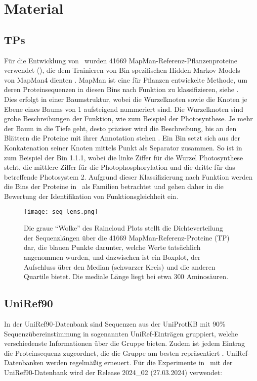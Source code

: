 \section{Material} %
\label{sec:material}
    \subsection{\aclp{TP}} %
        \label{sub:mapman}
        Für die Entwicklung von \protfin\ wurden 41669 MapMan-Referenz-Pflanzenproteine verwendet (), die dem Trainieren von Bin-spezifischen Hidden Markov Models von MapMan4 dienten \autocite{mapman}. MapMan ist eine für Pflanzen entwickelte Methode, um deren Proteinsequenzen in diesen Bins nach Funktion zu klassifizieren, siehe . Dies erfolgt in einer Baumstruktur, wobei die Wurzelknoten sowie die Knoten je Ebene eines Baums von 1 aufsteigend nummeriert sind. Die Wurzelknoten sind grobe Beschreibungen der Funktion, wie zum Beispiel der Photosynthese. Je mehr der Baum in die Tiefe geht, desto präziser wird die Beschreibung, bis an den Blättern die Proteine mit ihrer Annotation stehen \autocite{mapman}\autocite{mapman}. Ein Bin setzt sich aus der Konkatenation seiner Knoten mittels Punkt als Separator zusammen. So ist in  zum Beispiel der Bin 1.1.1, wobei die linke Ziffer für die Wurzel Photosynthese steht, die mittlere Ziffer für die Photophosphorylation und die dritte für das betreffende Photosystem 2. Aufgrund dieser Klassifizierung nach Funktion werden die Bins der Proteine in \protfin\ als Familien betrachtet und gehen daher in die Bewertung der Identifikation von Funktionsgleichheit ein.

        \begin{figure}[H]
            \texttt{[image: seq\_lens.png]}
            \caption[Raincloud Plot der \acl{TP} Sequenzlängen]{Die graue ``Wolke'' des Raincloud Plots stellt die Dichteverteilung der Sequenzlängen über die 41669 MapMan-Referenz-Proteine (\acl{TP}) dar, die blauen Punkte darunter, welche Werte tatsächlich angenommen wurden, und dazwischen ist ein Boxplot, der Aufschluss über den Median (schwarzer Kreis) und die anderen Quartile bietet. Die mediale Länge liegt bei etwa 300 Aminosäuren.}
            \label{fig:sequences}
        \end{figure}

    \subsection{UniRef90} %
        \label{sub:uniref90}
        In der UniRef90-Datenbank sind Sequenzen aus der UniProtKB \autocite{uniprot} mit 90\% Sequenzübereinstimmung in sogenannten UniRef-Einträgen gruppiert, welche verschiedenste Informationen über die Gruppe bieten. Zudem ist jedem Eintrag die Proteinsequenz zugeordnet, die die Gruppe am besten repräsentiert \autocite{uniref}. UniRef-Datenbanken werden regelmäßig erneuert. Für die Experimente in \protfin\ mit der UniRef90-Datenbank wird der Release 2024\_02 (27.03.2024) verwendet:


